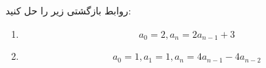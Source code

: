     \p 
   روابط بازگشتی زیر را حل کنید:
   \begin{enumerate}
   \item
   $$a_0 = 2, a_n = 2a_{n-1} + 3$$
   \item
   $$a_0 = 1, a_1 = 1, a_n = 4a_{n-1} - 4a_{n-2}$$
   \end{enumerate}